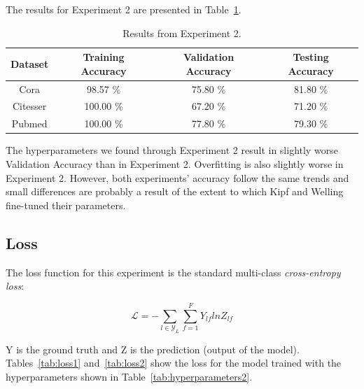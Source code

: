 The results for Experiment 2 are presented in Table~\ref{tab:results2}.

\begin {table}[ht!]
  \begin{center}
    \begin{tabular}{|c|c|c|c|}
    \hline
    Dataset    &  Training Accuracy & Validation Accuracy & Testing Accuracy\\ \hline
    Cora          & 98.57 \% & 75.80 \%  & 81.80 \% \\ 
    Citesser      & 100.00 \%& 67.20 \%  & 71.20 \% \\
    Pubmed        & 100.00 \%& 77.80 \%  & 79.30 \% \\
    \hline
    \end{tabular}
  \end{center}
\caption {Results from Experiment 2.} \label{tab:results2} 
\end{table}

The hyperparameters we found through Experiment 2 result in slightly worse Validation Accuracy than in Experiment 2. Overfitting is also slightly worse in Experiment 2. However, both experiments' accuracy follow the same trends and small differences are probably a result of the extent to which Kipf and Welling fine-tuned their parameters. 

\subsection{Loss}

The loss function for this experiment is the standard multi-class \textit{cross-entropy loss}:

\begin{equation}
  \label{loss}
  \mathcal{L} = - \sum_{l \in \mathcal{Y}_{L}} \sum_{f=1}^{F} Y_{lf}lnZ_{lf}  
\end{equation}

Y is the ground truth and Z is the prediction (output of the model). Tables~\ref{tab:loss1} and~\ref{tab:loss2} show the loss for the model trained with the hyperparameters shown in Table~\ref{tab:hyperparameters2}.

